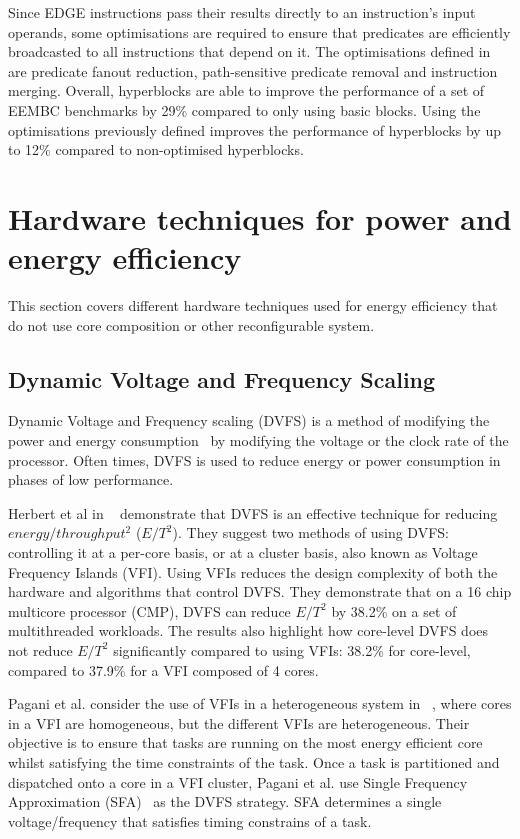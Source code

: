 Since EDGE instructions pass their results directly to an instruction's input operands, some optimisations are required to ensure that predicates are efficiently broadcasted to all instructions that depend on it.
The optimisations defined in ~\cite{smith2006dataflowpred} are predicate fanout reduction, path-sensitive predicate removal and instruction merging.
Overall, hyperblocks are able to improve the performance of a set of EEMBC benchmarks by 29\% compared to only using basic blocks.
Using the optimisations previously defined improves the performance of hyperblocks by up to 12\% compared to non-optimised hyperblocks.


\section{Hardware techniques for power and energy efficiency}

This section covers different hardware techniques used for energy efficiency that do not use core composition or other reconfigurable system.

\subsection{Dynamic Voltage and Frequency Scaling}
Dynamic Voltage and Frequency scaling (DVFS) is a method of modifying the power and energy consumption~\cite{paganiEECHM2017} by modifying the voltage or the clock rate of the processor.
Often times, DVFS is used to reduce energy or power consumption in phases of low performance.

Herbert et al in ~\cite{herbertDVFS07} demonstrate that DVFS is an effective technique for reducing $energy/throughput^2$ ($E/T^2$).
They suggest two methods of using DVFS: controlling it at a per-core basis, or at a cluster basis, also known as Voltage Frequency Islands (VFI).
Using VFIs reduces the design complexity of both the hardware and algorithms that control DVFS.
They demonstrate that on a 16 chip multicore processor (CMP), DVFS can reduce $E/T^2$ by 38.2\% on a set of multithreaded workloads.
The results also highlight how core-level DVFS does not reduce $E/T^2$ significantly compared to using VFIs: 38.2\% for core-level, compared to 37.9\% for a VFI composed of 4 cores.

Pagani et al. consider the use of VFIs in a heterogeneous system in ~\cite{paganiEECHM2017}, where cores in a VFI are homogeneous, but the different VFIs are heterogeneous.
Their objective is to ensure that tasks are running on the most energy efficient core whilst satisfying the time constraints of the task.
Once a task is partitioned and dispatched onto a core in a VFI cluster, Pagani et al. use Single Frequency Approximation (SFA)~\cite{sfaScheme} as the DVFS strategy.
SFA determines a single voltage/frequency that satisfies timing constrains of a task.


